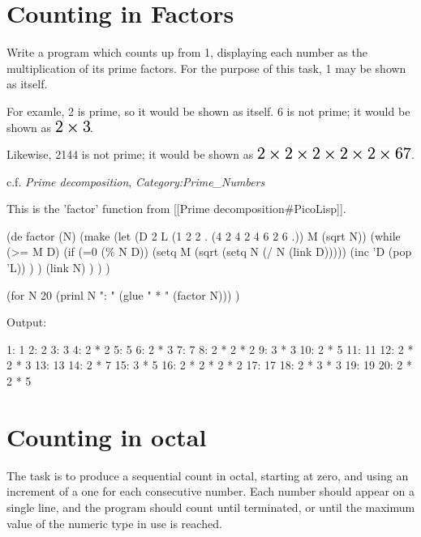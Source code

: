 \pagebreak{}
\section*{Counting in Factors}

Write a program which counts up from 1, displaying each number as the
multiplication of its prime factors. For the purpose of this task, 1 may
be shown as itself.

For examle, 2 is prime, so it would be shown as itself. 6 is not prime;
it would be shown as
\includegraphics[scale=.6]{graphics/4b3a89ff7af9ad06700897f831201197.png}.

Likewise, 2144 is not prime; it would be shown as
\includegraphics[scale=.6]{graphics/eae4d1b7a3788fd85e5c4995efc7e196.png}.

c.f. \emph{Prime decomposition}, \emph{Category:Prime\_Numbers}


\begin{wideverbatim}

This is the 'factor' function from [[Prime decomposition#PicoLisp]].

(de factor (N)
   (make
      (let (D 2  L (1 2 2 . (4 2 4 2 4 6 2 6 .))  M (sqrt N))
         (while (>= M D)
            (if (=0 (\% N D))
               (setq M (sqrt (setq N (/ N (link D)))))
               (inc 'D (pop 'L)) ) )
         (link N) ) ) )

(for N 20
   (prinl N ": " (glue " * " (factor N))) )

Output:

1: 1
2: 2
3: 3
4: 2 * 2
5: 5
6: 2 * 3
7: 7
8: 2 * 2 * 2
9: 3 * 3
10: 2 * 5
11: 11
12: 2 * 2 * 3
13: 13
14: 2 * 7
15: 3 * 5
16: 2 * 2 * 2 * 2
17: 17
18: 2 * 3 * 3
19: 19
20: 2 * 2 * 5

\end{wideverbatim}

\pagebreak{}
\section*{Counting in octal}

The task is to produce a sequential count in octal, starting at zero,
and using an increment of a one for each consecutive number. Each number
should appear on a single line, and the program should count until
terminated, or until the maximum value of the numeric type in use is
reached.

